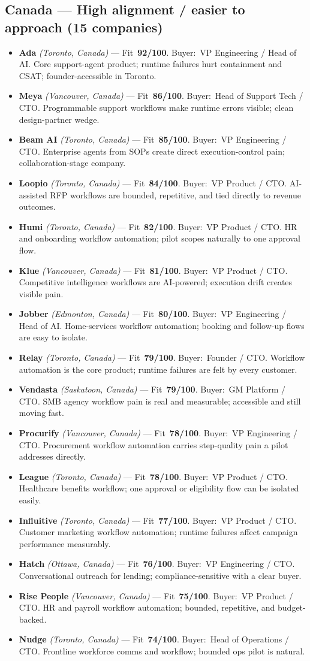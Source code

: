 \documentclass[10pt]{article}
\newcommand{\cand}[5]{\item \textbf{#1} \textit{(#2)} --- Fit~\textbf{#3/100}. Buyer:~#4. #5}
\newcommand{\topcand}[5]{\item \textcolor{green!50!black}{\textbf{#1} \textit{(#2)}} --- Fit~\textbf{#3/100}. Buyer:~#4. #5}
\begin{document}
\subsection{Canada --- High alignment / easier to approach (15 companies)}
\begin{itemize}
\topcand{Ada}{Toronto, Canada}{92}{VP Engineering / Head of AI}{Core support-agent product; runtime failures hurt containment and CSAT; founder-accessible in Toronto.}
\cand{Meya}{Vancouver, Canada}{86}{Head of Support Tech / CTO}{Programmable support workflows make runtime errors visible; clean design-partner wedge.}
\cand{Beam AI}{Toronto, Canada}{85}{VP Engineering / CTO}{Enterprise agents from SOPs create direct execution-control pain; collaboration-stage company.}
\cand{Loopio}{Toronto, Canada}{84}{VP Product / CTO}{AI-assisted RFP workflows are bounded, repetitive, and tied directly to revenue outcomes.}
\cand{Humi}{Toronto, Canada}{82}{VP Product / CTO}{HR and onboarding workflow automation; pilot scopes naturally to one approval flow.}
\cand{Klue}{Vancouver, Canada}{81}{VP Product / CTO}{Competitive intelligence workflows are AI-powered; execution drift creates visible pain.}
\cand{Jobber}{Edmonton, Canada}{80}{VP Engineering / Head of AI}{Home-services workflow automation; booking and follow-up flows are easy to isolate.}
\cand{Relay}{Toronto, Canada}{79}{Founder / CTO}{Workflow automation is the core product; runtime failures are felt by every customer.}
\cand{Vendasta}{Saskatoon, Canada}{79}{GM Platform / CTO}{SMB agency workflow pain is real and measurable; accessible and still moving fast.}
\cand{Procurify}{Vancouver, Canada}{78}{VP Engineering / CTO}{Procurement workflow automation carries step-quality pain a pilot addresses directly.}
\cand{League}{Toronto, Canada}{78}{VP Product / CTO}{Healthcare benefits workflow; one approval or eligibility flow can be isolated easily.}
\cand{Influitive}{Toronto, Canada}{77}{VP Product / CTO}{Customer marketing workflow automation; runtime failures affect campaign performance measurably.}
\cand{Hatch}{Ottawa, Canada}{76}{VP Engineering / CTO}{Conversational outreach for lending; compliance-sensitive with a clear buyer.}
\cand{Rise People}{Vancouver, Canada}{75}{VP Product / CTO}{HR and payroll workflow automation; bounded, repetitive, and budget-backed.}
\cand{Nudge}{Toronto, Canada}{74}{Head of Operations / CTO}{Frontline workforce comms and workflow; bounded ops pilot is natural.}
\end{itemize}
\end{document}
